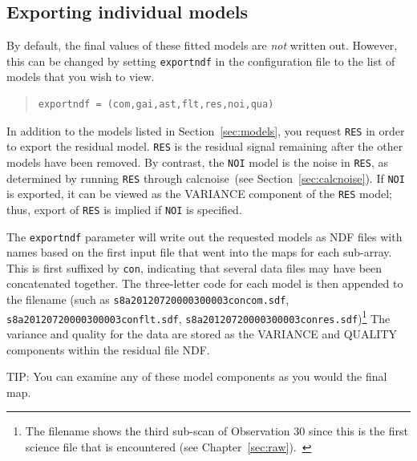 \documentclass[twoside,11pt]{article}
\newcommand{\htmlref}[2]{#1}
\newenvironment{latexonly}{}{}
\newcommand{\latex}[1]{#1}
\newcommand{\latexhtml}[2]{#1}
\newcommand{\xref}[3]{#1}
\newcommand{\xlabel}[1]{}
\renewcommand{\_}{\texttt{\symbol{95}}}
\newenvironment{fmpage}[1]{\begin{lrbox}{\fmbox}\begin{minipage}{#1}}{\end{minipage}\end{lrbox}\fbox{\usebox{\fmbox}}}
\newcommand{\task}[1]{\textsf{#1}}
\newcommand{\file}[1]{\texttt{#1}}
\newcommand{\model}[1]{\texttt{#1}}
\newcommand{\calcnoise}{\xref{\task{calcnoise}}{sun258}{CALCNOISE}}
\newcommand{\cref}[3]{\latexhtml{#1~\ref{#2}}{\htmlref{#3}{#2}}}
\begin{document}
\subsection{\xlabel{export}Exporting individual models}
\label{sec:export}

By default, the final values of these fitted models are \emph{not}
written out. However, this can be changed by setting
\texttt{exportndf} in the configuration file to the list of models
that you wish to view.
\vspace{0cm}
\begin{quote}
\begin{verbatim}
exportndf = (com,gai,ast,flt,res,noi,qua)
\end{verbatim}
\end{quote}

In addition to the models listed in \cref{Section}{sec:models}{The
individual models}, you request \model{RES} in order to export the
residual model. \model{RES} is the residual signal remaining after
the other models have been removed. By contrast, the \model{NOI}
model is the noise in \model{RES}, as determined by running
\model{RES} through \calcnoise\ (see
\cref{Section}{sec:calcnoise}{Checking the array performance}). If
\model{NOI} is exported, it can be viewed as the VARIANCE component
of the \model{RES} model; thus, export of \model{RES} is implied if
\model{NOI} is specified.


The \texttt{exportndf} parameter will write out the requested models
as NDF files with names based on the first input file that went into
the maps for each sub-array. This is first suffixed by \texttt{con},
indicating that several data files may have been concatenated
together. The three-letter code for each model is then appended to the
filename (such as \file{s8a20120720\_00030\_0003\_con\_com.sdf},
\begin{latexonly} \linebreak %
\end{latexonly} \file{s8a20120720\_00030\_0003\_con\_flt.sdf},
\file{s8a20120720\_00030\_0003\_con\_res.sdf})\footnote{The filename
shows the third sub-scan of Observation 30 since this is the first science
file that is encountered (see \cref{Chapter}{sec:raw}{Handling Raw
SCUBA-2 Data}).~} The variance and quality for the data are stored as
the VARIANCE and QUALITY components within the residual file NDF.

\begin{latexonly}
\begin{center}
\begin{fmpage}{0.95\linewidth}
\vspace{0.1cm}
TIP: You can examine any of these model components as you would the final map.
\end{fmpage}
\end{center}
\end{latexonly}
\end{document}
